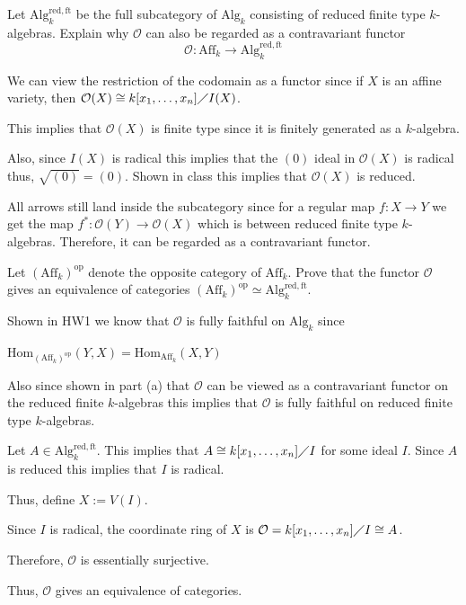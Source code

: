 \documentclass[12pt, letterpaper]{article}
\begin{document}
\begin{problem}{}

\end{problem}
\begin{subproblem}{}
    Let $\mathrm{Alg}_k^{\mathrm{red,ft}}$ be the full subcategory of $\mathrm{Alg}_k$ consisting of reduced
    finite type $k$-algebras. Explain why $\mathcal{O}$ can also be regarded as a contravariant functor
    \[\mathcal{O} : \mathrm{Aff}_k \to \mathrm{Alg}_k^{\mathrm{red,ft}}\]
\end{subproblem} 
\begin{problemproof}
    We can view the restriction of the codomain as a functor since if $X$ is an affine variety, then $\mathcal{O}(X) \cong k[x_1,\dots,x_n] \diagup I(X)$.

    This implies that $\mathcal{O}(X)$ is finite type since it is finitely generated as a $k$-algebra.

    Also, since $I(X)$ is radical this implies that the $(0)$ ideal in $\mathcal{O}(X)$ is radical thus, $\sqrt{(0)}=(0)$. Shown in class this implies that $\mathcal{O}(X)$ is reduced.

    All arrows still land inside the subcategory since for a regular map $f : X \to Y$ we get the map $f^*: \mathcal{O}(Y) \to \mathcal{O}(X)$ which is between reduced finite type $k$-algebras.
    Therefore, it can be regarded as a contravariant functor.
\end{problemproof}
\begin{subproblem}{}
    Let $(\mathrm{Aff}_k)^\mathrm{op}$ denote the opposite category of $\mathrm{Aff}_k$. Prove that the functor $\mathcal{O}$ gives an
equivalence of categories $(\mathrm{Aff}_k)^\mathrm{op} \simeq \mathrm{Alg}^\mathrm{red,ft}_k$.
\end{subproblem}
\begin{problemproof}
    Shown in HW1 we know that $\mathcal{O}$ is fully faithful on $\mathrm{Alg}_k$ since
    
    $\mathrm{Hom}_{(\mathrm{Aff}_k)^\mathrm{op}}(Y,X) = \mathrm{Hom}_{\mathrm{Aff}_k}(X,Y)$

    Also since shown in part (a) that $\mathcal{O}$ can be viewed as a contravariant functor on the reduced finite $k$-algebras this implies that $\mathcal{O}$ is fully faithful on reduced finite type $k$-algebras.

    Let $A \in \mathrm{Alg}_k^{\mathrm{red,ft}}$. This implies that $A \cong k[x_1,\dots,x_n] \diagup I$ for some ideal $I$. Since $A$ is reduced this implies that $I$ is radical.

    Thus, define $X := V(I)$. 
    
    Since $I$ is radical, the coordinate ring of $X$ is $\mathcal{O} = k[x_1,\dots,x_n] \diagup I \cong A$.

    Therefore, $\mathcal{O}$ is essentially surjective.

    Thus, $\mathcal{O}$ gives an equivalence of categories.
\end{problemproof}
    
\end{document}
